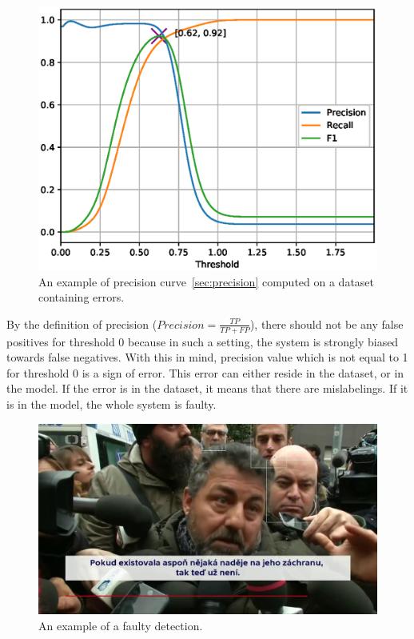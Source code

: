 \begin{figure}[H]
    \centering
    \includegraphics[width=0.95\columnwidth]{images/implementation/faulty_prft.eps}
    \caption{An example of precision curve~\ref{sec:precision} computed on a dataset containing errors.}
    \label{fig:faulty_prft}
\end{figure}

By the definition of precision ($Precision = \frac{TP}{TP+FP}$), there should not be any false positives
for threshold 0 because in such a setting, the system is strongly biased towards false negatives.
With this in mind, precision value which is not equal to 1 for threshold 0 is a sign of error.
This error can either reside in the dataset, or in the model.
If the error is in the dataset, it means that there are mislabelings.
If it is in the model, the whole system is faulty.

\begin{figure}[H]
    \centering
    \includegraphics[width=0.9\columnwidth]{images/implementation/faulty_detection.jpg}
    \caption{An example of a faulty detection.}
    \label{fig:faulty_bbox}
\end{figure}


